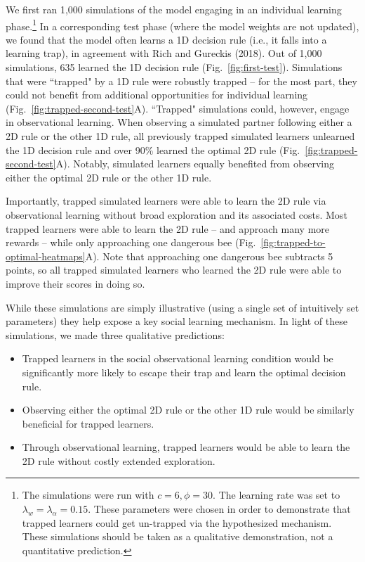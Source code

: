 \documentclass[11pt]{article} %
\begin{document}
We first ran 1,000 simulations of the model engaging in an individual learning phase.\footnote{The simulations were run with $c=6, \phi=30$. The learning rate was set to $\lambda_w=\lambda_\alpha=0.15$.  These parameters were chosen in order to demonstrate that trapped learners could get un-trapped via the hypothesized mechanism. These simulations should be taken as a qualitative demonstration, not a quantitative prediction.} In a corresponding test phase (where the model weights are not updated), we found that the model often learns a 1D decision rule (i.e., it falls into a learning trap), in agreement with Rich and Gureckis (2018). Out of 1,000 simulations, 635 learned the 1D decision rule (Fig.~\ref{fig:first-test}). Simulations that were ``trapped" by a 1D rule were robustly trapped -- for the most part, they could not benefit from additional opportunities for individual learning (Fig.~\ref{fig:trapped-second-test}A). ``Trapped" simulations could, however, engage in observational learning. When observing a simulated partner following either a 2D rule or the other 1D rule, all previously trapped simulated learners unlearned the 1D decision rule and over 90\% learned the optimal 2D rule (Fig.~\ref{fig:trapped-second-test}A). Notably, simulated learners equally benefited from observing either the optimal 2D rule or the other 1D rule.

Importantly, trapped simulated learners were able to learn the 2D rule via observational learning without broad exploration and its associated costs. Most trapped learners were able to learn the 2D rule -- and approach many more rewards -- while only approaching one dangerous bee (Fig.~\ref{fig:trapped-to-optimal-heatmaps}A). Note that approaching one dangerous bee subtracts 5 points, so all trapped simulated learners who learned the 2D rule were able to improve their scores in doing so. %

While these simulations are simply illustrative (using a single set of intuitively set parameters) they help expose a key social learning mechanism.  In light of these simulations, we made three qualitative predictions:
\begin{itemize}
    \item Trapped learners in the social observational learning condition would be significantly more likely to escape their trap and learn the optimal decision rule.
    \item Observing either the optimal 2D rule or the other 1D rule would be similarly beneficial for trapped learners.
    \item Through observational learning, trapped learners would be able to learn the 2D rule without costly extended exploration.
\end{itemize} 
\end{document}

